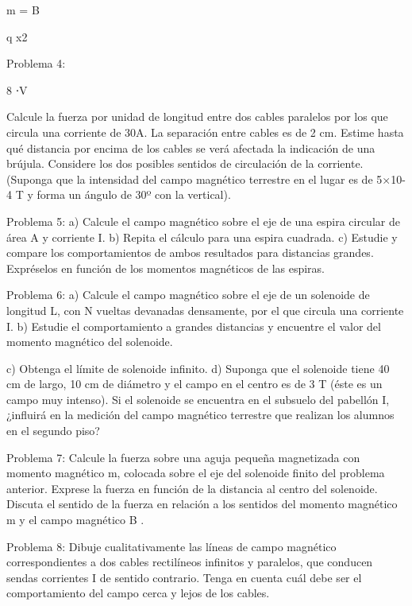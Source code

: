 m = B
 
q x2
 

Problema 4:
 
8 ⋅V
 
Calcule la fuerza por unidad de longitud entre dos cables paralelos por los que circula una corriente de 30A. La separación entre cables es de 2 cm. Estime hasta qué distancia por encima de los cables se verá afectada la indicación de una brújula. Considere los dos posibles sentidos de circulación de la corriente. (Suponga que la intensidad del campo magnético terrestre en el lugar es de 5×10-4 T y forma un ángulo de 30º con la vertical).

Problema 5:
a)	Calcule el campo magnético sobre el eje de una espira circular de área A y corriente I.
b)	Repita el cálculo para una espira cuadrada.
c)	Estudie  y compare  los  comportamientos  de  ambos  resultados  para  distancias  grandes.
Expréselos en función de los momentos magnéticos de las espiras.

Problema 6:
a)	Calcule el campo magnético sobre el eje de un solenoide de longitud L, con N vueltas devanadas densamente, por el que circula una corriente I.
b)	Estudie  el  comportamiento  a  grandes  distancias  y  encuentre  el  valor  del  momento magnético del solenoide.
 


c)	Obtenga el límite de solenoide infinito.
d)	Suponga que el solenoide tiene 40 cm de largo, 10 cm de diámetro y el campo en el centro es de 3 T (éste es un campo muy intenso). Si el solenoide se encuentra en el subsuelo del pabellón I, ¿influirá en la medición del campo magnético terrestre que realizan los alumnos en el segundo piso?

Problema 7:
Calcule la fuerza sobre una aguja pequeña magnetizada con momento magnético m, colocada sobre el eje del solenoide finito del problema anterior. Exprese la fuerza en función de la distancia al centro del solenoide. Discuta el sentido de la fuerza en relación a los sentidos del momento magnético m y el campo magnético B .

Problema 8:
Dibuje cualitativamente las líneas de campo magnético correspondientes a dos cables rectilíneos infinitos y paralelos, que conducen sendas corrientes I de sentido contrario. Tenga en cuenta cuál debe ser el comportamiento del campo cerca y lejos de los cables.


